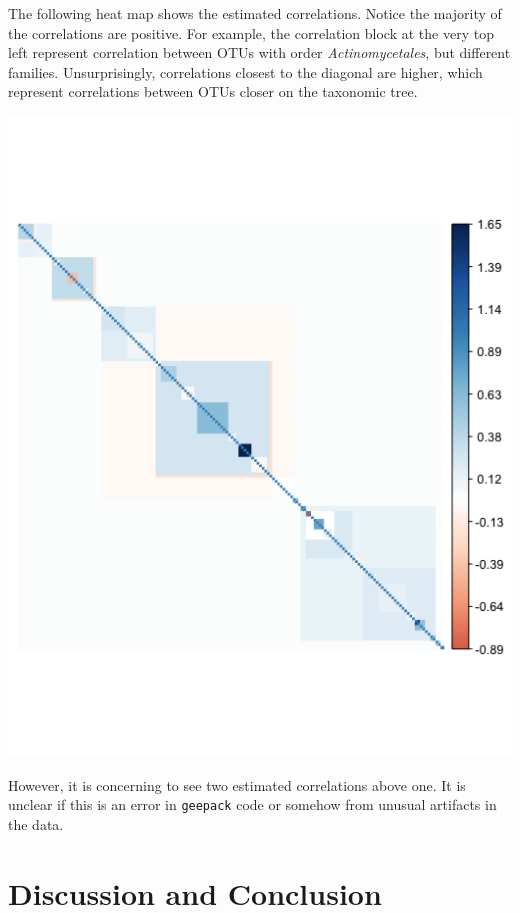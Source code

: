 \documentclass[12pt]{article}
\begin{document}
\hspace*{-\parindent}%
\begin{minipage}{.6\textwidth}
  The following heat map shows the estimated correlations. Notice the majority of the correlations are positive. For example, the correlation block at the very top left represent correlation between OTUs with order \textit{Actinomycetales}, but different families.  Unsurprisingly, correlations closest to the diagonal are higher, which represent correlations between OTUs closer on the taxonomic tree.
\end{minipage}%
\begin{minipage}{0.4\textwidth}
    \centering
    \includegraphics[width = .8\textwidth]{normal_corr.png}
\end{minipage}

However, it is concerning to see two estimated correlations above one. It is unclear if this is an error in \texttt{geepack} code or somehow from unusual artifacts in the data.



\section{Discussion and Conclusion}
\end{document}
